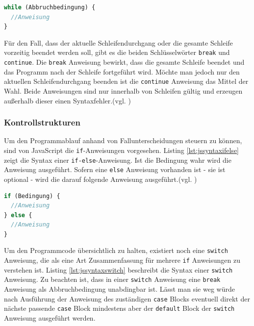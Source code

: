 \vspace{1em}
\begin{lstlisting}[language=JavaScript, caption=Syntax While-Schleife, label=lst:jssyntaxwhile]
while (Abbruchbedingung) {
  //Anweisung
}
\end{lstlisting}
	
Für den Fall, dass der aktuelle Schleifendurchgang oder die gesamte Schleife vorzeitig beendet werden soll, gibt es die beiden Schlüsselwörter \texttt{break} und \texttt{continue}. Die \texttt{break} Anweisung bewirkt, dass die gesamte Schleife beendet und das Programm nach der Schleife fortgeführt wird. Möchte man jedoch nur den aktuellen Schleifendurchgang beenden ist die \texttt{continue} Anweisung das Mittel der Wahl. Beide Anweisungen sind nur innerhalb von Schleifen gültig und erzeugen außerhalb dieser einen Syntaxfehler.(vgl. \cite[S.103f]{FlanJava2007})

\subsubsection{Kontrollstrukturen} Um den Programmablauf anhand von Fallunterscheidungen steuern zu können, sind von JavaScript die \texttt{if}-Anweisungen vorgesehen. Listing \ref{lst:jssyntaxifelse} zeigt die Syntax einer \texttt{if-else}-Anweisung. Ist die Bedingung wahr wird die Anweisung ausgeführt. Sofern eine \texttt{else} Anweisung vorhanden ist - sie ist optional - wird die darauf folgende Anweisung ausgeführt.(vgl. \cite[S.80]{WenzJava2008})

\vspace{1em}
\begin{lstlisting}[language=JavaScript, caption=Syntax If-else-Anweisung, label=lst:jssyntaxifelse]
if (Bedingung) {
  //Anweisung
} else {
  //Anweisung
}
\end{lstlisting}
	
Um den Programmcode übersichtlich zu halten, existiert noch eine \texttt{switch} Anweisung, die als eine Art Zusammenfassung für mehrere \texttt{if} Anweisungen zu verstehen ist. Listing \ref{lst:jssyntaxswitch} beschreibt die Syntax einer \texttt{switch} Anweisung. Zu beachten ist, dass in einer \texttt{switch} Anweisung eine \texttt{break} Anweisung als Abbruchbedingung unabdingbar ist. Lässt man sie weg würde nach Ausführung der Anweisung des zuständigen \texttt{case} Blocks eventuell direkt der nächste passende \texttt{case} Block mindestens aber der \texttt{default} Block der \texttt{switch} Anweisung ausgeführt werden.

